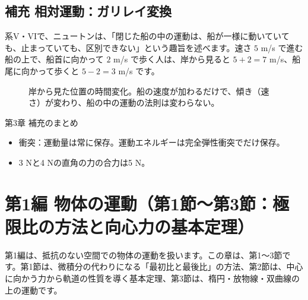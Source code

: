 \documentclass[a4paper,11pt,openany]{ltjsbook}
\begin{document}
\section{補充 相対運動：ガリレイ変換}

系V・VIで、ニュートンは、「閉じた船の中の運動は、船が一様に動いていても、止まっていても、区別できない」という趣旨を述べます。速さ $5$ m/s で進む船の上で、船首に向かって $2$ m/s で歩く人は、岸から見ると $5+2=7$ m/s、船尾に向かって歩くと $5-2=3$ m/s です。

\begin{figure}[htbp]
\centering
{}
\caption{岸から見た位置の時間変化。船の速度が加わるだけで、傾き（速さ）が変わり、船の中の運動の法則は変わらない。}
\end{figure}

\begin{pointbox}{第3章 補充のまとめ}
\begin{itemize}[leftmargin=*]
\item 衝突：運動量は常に保存。運動エネルギーは完全弾性衝突でだけ保存。
\item 3 Nと4 Nの直角の力の合力は5 N。
\end{itemize}
\end{pointbox}

\chapter{第1編 物体の運動（第1節〜第3節：極限比の方法と向心力の基本定理）}

第1編は、抵抗のない空間での物体の運動を扱います。この章は、第1〜3節です。第1節は、微積分の代わりになる「最初比と最後比」の方法、第2節は、中心に向かう力から軌道の性質を導く基本定理、第3節は、楕円・放物線・双曲線の上の運動です。
\end{document}
